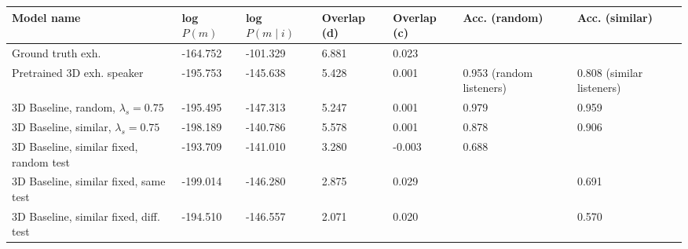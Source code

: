 \begin{table}[]
	\begin{tabularx}{\textwidth}{|X|l|l|X|X|X|X|}
		\hline
		\textbf{Model name}                                    & \textbf{log $P(m)$} & \textbf{log $P(m \mid i)$} & \textbf{Overlap (d)} & \textbf{Overlap (c)} & \textbf{Acc. (random)} & \textbf{Acc. (similar)} \\ \hline
		Ground truth exh.       &      -164.752            &         -101.329               &       6.881             &      0.023               &                 &                \\ \hline
		Pretrained 3D exh. speaker                            &       -195.753            &         -145.638               &        5.428              &      0.001                & 0.953 (random listeners)                 & 0.808 (similar listeners)                 \\ \hline
		3D Baseline, random, $\lambda_s = 0.75$  &       -195.495        &           -147.313           &          5.247            &         0.001             & 0.979                                    &                        0.959                   \\ \hline
		3D Baseline, similar, $\lambda_s = 0.75$ &      -198.189             &       -140.786                 &           5.578           &        0.001              & 0.878                      &            0.906                        \\ \hline
		3D Baseline, similar fixed, random test &       -193.709            &    -141.010                  &        3.280            &      -0.003         &            0.688       &                           \\ \hline
		3D Baseline, similar fixed, same test &      -199.014        &        -146.280           &        2.875       &      0.029   &              &          0.691                   \\ \hline
		3D Baseline, similar fixed, diff. test &     -194.510     &    -146.557          &   2.071      & 0.020    &                &              0.570          \\ \hline

\end{tabularx}
\end{table}
